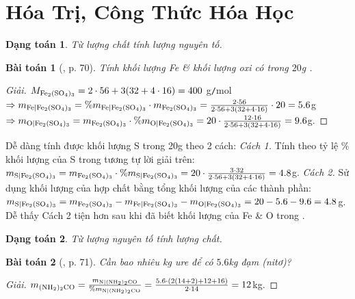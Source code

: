 \documentclass{article}
\newtheorem{baitoan}{Bài toán}
\newtheorem{dangtoan}{Dạng toán}
\begin{document}

\section{Hóa Trị, Công Thức Hóa Học}

\begin{dangtoan}
	Từ lượng chất tính lượng nguyên tố.
\end{dangtoan}

\begin{baitoan}[\cite{Tuan2022}, p. 70]
	Tính khối lượng \emph{Fe} \& khối lượng oxi có trong $20$\emph{g} \emph{}.
\end{baitoan}

\begin{proof}[Giải]
	$M_{\ce{Fe2(SO4)3}} = 2\cdot56 + 3(32 + 4\cdot16) = 400$ g\texttt{/}mol$\Rightarrow m_{\ce{Fe|Fe2(SO4)3}} = \%m_{\ce{Fe|Fe2(SO4)3}}\cdot m_{\ce{Fe2(SO4)3}} = \frac{2\cdot56}{2\cdot56 + 3(32 + 4\cdot16)}\cdot20 = 5.6$g$\Rightarrow m_{\ce{O|Fe2(SO4)3}} = m_{\ce{Fe2(SO4)3}}\cdot\%m_{\ce{O|Fe2(SO4)3}} = 20\cdot\frac{12\cdot16}{2\cdot56 + 3(32 + 4\cdot16)} = 9.6$g.
\end{proof}
Dễ dàng tính được khối lượng S trong 20g  theo 2 cách: \textit{Cách 1.} Tính theo tỷ lệ \% khối lượng của S trong  tương tự lời giải trên: $m_{\ce{S|Fe2(SO4)3}} = m_{\ce{Fe2(SO4)3}}\cdot\%m_{\ce{S|Fe2(SO4)3}} = 20\cdot\frac{3\cdot32}{2\cdot56 + 3(32 + 4\cdot16)} = 4.8$g. \textit{Cách 2.} Sử dụng khối lượng của hợp chất bằng tổng khối lượng của các thành phần: $m_{\ce{S|Fe2(SO4)3}} = m_{\ce{Fe2(SO4)3}} - m_{\ce{Fe|Fe2(SO4)3}} - m_{\ce{O|Fe2(SO4)3}} = 20 - 5.6 - 9.6 = 4.8$g. Dễ thấy Cách 2 tiện hơn sau khi đã biết khối lượng của Fe \& O trong .

\begin{dangtoan}
	Từ lượng nguyên tố tính lượng chất.
\end{dangtoan}

\begin{baitoan}[\cite{Tuan2022}, p. 71]
	Cần bao nhiêu \emph{kg} ure \emph{} để có $5.6$\emph{kg} đạm (nitơ)?
\end{baitoan}

\begin{proof}[Giải]
	$m_{\ce{(NH2)2CO}} = \frac{m_{\ce{N|(NH2)2CO}}}{\%m_{\ce{N|(NH2)2CO}}} = \frac{5.6\cdot(2(14 + 2) + 12 + 16)}{2\cdot14} = 12$kg.
\end{proof}
\end{document}
